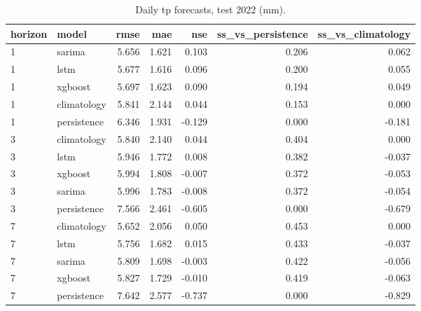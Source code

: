 \begin{table}[t]
\centering
\caption{Daily tp forecasts, test 2022 (mm).}
\label{tab:daily_tp}
\begin{tabular}{llrrrrr}
\toprule
horizon & model & rmse & mae & nse & ss\_vs\_persistence & ss\_vs\_climatology \\
\midrule
1 & sarima & 5.656 & 1.621 & 0.103 & 0.206 & 0.062 \\
1 & lstm & 5.677 & 1.616 & 0.096 & 0.200 & 0.055 \\
1 & xgboost & 5.697 & 1.623 & 0.090 & 0.194 & 0.049 \\
1 & climatology & 5.841 & 2.144 & 0.044 & 0.153 & 0.000 \\
1 & persistence & 6.346 & 1.931 & -0.129 & 0.000 & -0.181 \\
3 & climatology & 5.840 & 2.140 & 0.044 & 0.404 & 0.000 \\
3 & lstm & 5.946 & 1.772 & 0.008 & 0.382 & -0.037 \\
3 & xgboost & 5.994 & 1.808 & -0.007 & 0.372 & -0.053 \\
3 & sarima & 5.996 & 1.783 & -0.008 & 0.372 & -0.054 \\
3 & persistence & 7.566 & 2.461 & -0.605 & 0.000 & -0.679 \\
7 & climatology & 5.652 & 2.056 & 0.050 & 0.453 & 0.000 \\
7 & lstm & 5.756 & 1.682 & 0.015 & 0.433 & -0.037 \\
7 & sarima & 5.809 & 1.698 & -0.003 & 0.422 & -0.056 \\
7 & xgboost & 5.827 & 1.729 & -0.010 & 0.419 & -0.063 \\
7 & persistence & 7.642 & 2.577 & -0.737 & 0.000 & -0.829 \\
\bottomrule
\end{tabular}
\end{table}